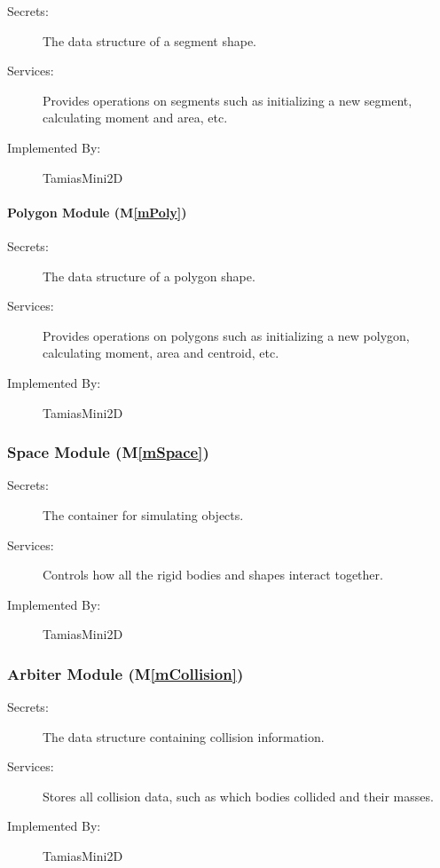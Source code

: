 \documentclass[12pt]{article}
\newcommand{\mref}[1]{M\ref{#1}}
\begin{document}
\begin{description}
	\item[Secrets:] The data structure of a segment shape.
	\item[Services:] Provides operations on segments such as initializing a new segment, calculating moment and area, etc.
	\item[Implemented By:] TamiasMini2D
\end{description}

\paragraph{Polygon Module (\mref{mPoly})}

\begin{description}
	\item[Secrets:] The data structure of a polygon shape.
	\item[Services:] Provides operations on polygons such as initializing a new polygon, calculating moment, area and centroid, etc.
	\item[Implemented By:] TamiasMini2D
\end{description}

\subsubsection{Space Module (\mref{mSpace})}

\begin{description}
	\item[Secrets:] The container for simulating objects.
	\item[Services:]Controls how all the rigid bodies and shapes interact together.
	\item[Implemented By:] TamiasMini2D
\end{description} 

\subsubsection{Arbiter Module (\mref{mCollision})}

\begin{description}
\item[Secrets:]The data structure containing collision information.
\item[Services:]Stores all collision data, such as which bodies 
collided and their masses.
\item[Implemented By:] TamiasMini2D
\end{description}
 
\end{document}
